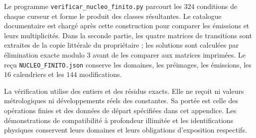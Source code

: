 Le programme \texttt{verificar\_nucleo\_finito.py} parcourt les $324$
conditions de chaque curseur et forme le produit des classes résultantes.
Le catalogue documentaire est chargé après cette construction pour
comparer les émissions et leurs multiplicités. Dans la seconde partie,
les quatre matrices de transitions sont extraites de la copie littérale
du propriétaire ; les solutions sont calculées par élimination exacte
modulo $3$ avant de les comparer aux matrices imprimées. Le reçu
\texttt{NUCLEO\_FINITO.json} conserve les domaines, les préimages,
les émissions, les $16$ calendriers et les $144$ modifications.

La vérification utilise des entiers et des résidus exacts. Elle ne reçoit ni valeurs
métrologiques ni développements réels des constantes. Sa portée
est celle des opérations finies et des données de départ spécifiées
dans cet appendice. Les démonstrations de compatibilité à profondeur
illimitée et les identifications physiques conservent leurs domaines
et leurs obligations d’exposition respectifs.
